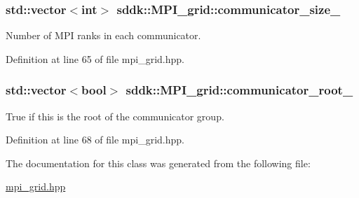 \subsubsection[{communicator\+\_\+size\+\_\+}]{\setlength{\rightskip}{0pt plus 5cm}std\+::vector$<$int$>$ sddk\+::\+M\+P\+I\+\_\+grid\+::communicator\+\_\+size\+\_\+\hspace{0.3cm}{\ttfamily [private]}}\label{classsddk_1_1_m_p_i__grid_af72671f0ea2a1d9e3f4e8d936623da7f}


Number of M\+P\+I ranks in each communicator. 



Definition at line 65 of file mpi\+\_\+grid.\+hpp.

\hypertarget{classsddk_1_1_m_p_i__grid_a527b7d25bb71e9e5798f047b0b1a7c99}{}
\subsubsection[{communicator\+\_\+root\+\_\+}]{\setlength{\rightskip}{0pt plus 5cm}std\+::vector$<$bool$>$ sddk\+::\+M\+P\+I\+\_\+grid\+::communicator\+\_\+root\+\_\+\hspace{0.3cm}{\ttfamily [private]}}\label{classsddk_1_1_m_p_i__grid_a527b7d25bb71e9e5798f047b0b1a7c99}


True if this is the root of the communicator group. 



Definition at line 68 of file mpi\+\_\+grid.\+hpp.



The documentation for this class was generated from the following file\+:\begin{DoxyCompactItemize}
\item 
\hyperlink{mpi__grid_8hpp}{mpi\+\_\+grid.\+hpp}\end{DoxyCompactItemize}
